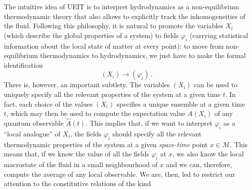 \documentclass[a4paper, amsfonts, amssymb, amsmath, reprint, twocolumn, showkeys, nofootinbib]{revtex4-2}
\begin{document}
The intuitive idea of UEIT is to interpret hydrodynamics as a non-equilibrium thermodynamic theory that also allows to explicitly track  the inhomogeneities of the fluid. Following this philosophy, it is natural to promote the variables $X_i$ (which describe the global properties of a system) to fields $\varphi_i$ (carrying statistical information about the local state of matter at every point): to move from non-equilibrium thermodynamics to hydrodynamics, we just have to make the formal identification
\begin{equation}\label{analogyY}
(X_i) \longrightarrow (\varphi_i) \, .
\end{equation}
%
%
There is, however, an important subtlety. The variables $(X_i)$ can be used to uniquely specify all the relevant properties of the system at a given time $t$. In fact, each choice of the values  $(X_i)$  specifies a unique ensemble at a given time $t$, which may then be used to compute the expectation value $A(X_i)$ of any quantum observable $\hat{A}(t)$. This implies that, if we want to interpret $\varphi_i$ as a ``local analogue'' of $X_i$, the fields $\varphi_i$ should specify all the relevant thermodynamic properties of the system at a given \textit{space-time} point $x\in \mathcal{M}$. 
This means that, if we know the value of all the fields $\varphi_i$ at $x$, we also know the local macrostate of the fluid in a small neighbourhood of $x$ and we can, therefore, compute the average of any local observable.
We are, then, led to restrict our attention to the constitutive relations of the kind 
\end{document}
